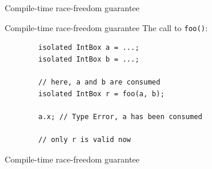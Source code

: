 \documentclass{beamer}
\begin{document}
\begin{frame}{Compile-time race-freedom guarantee}
	\begin{center}
	\end{center}
\end{frame}

\begin{frame}[fragile]{Compile-time race-freedom guarantee}
	The call to \texttt{foo()}:
	\begin{lstlisting}
        isolated IntBox a = ...;
        isolated IntBox b = ...;

        // here, a and b are consumed
        isolated IntBox r = foo(a, b);

        a.x; // Type Error, a has been consumed
        
        // only r is valid now
	\end{lstlisting}
\end{frame}


\begin{frame}{Compile-time race-freedom guarantee}
	\begin{center}
	\end{center}
\end{frame}
\end{document}
